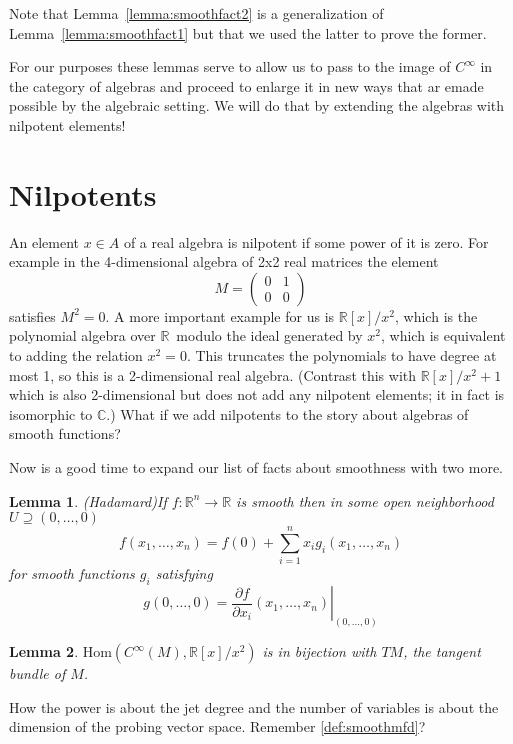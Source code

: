 \documentclass[12pt]{article}
\newcommand{\Hom}{\mathrm{Hom}}
\newcommand{\rr}{\ensuremath{\mathbb{R}}}
\newcommand{\cc}{\ensuremath{\mathbb{C}}}
\newcommand{\cinfty}{\ensuremath{C^{\infty}}}
\newtheorem{mylemma}{Lemma}
\begin{document}
Note that Lemma~\ref{lemma:smoothfact2} is a generalization of Lemma~\ref{lemma:smoothfact1} but that we used the latter to prove the former.

For our purposes these lemmas serve to allow us to pass to the image of $\cinfty$ in the category of algebras and proceed to enlarge it in new ways that ar emade possible by the algebraic setting. We will do that by extending the algebras with nilpotent elements!

\section{Nilpotents}\label{sec:nilpotents}

An element $x\in A$ of a real algebra is nilpotent if some power of it is zero. For example in the 4-dimensional algebra of 2x2 real matrices the element
\[
  M=\begin{pmatrix}
    0 & 1 \\
    0 & 0
  \end{pmatrix}
\]
satisfies $M^2=0$. A more important example for us is $\rr[x]/x^2$, which is the polynomial algebra over \rr\ modulo the ideal generated by $x^2$, which is equivalent to adding the relation $x^2=0$. This truncates the polynomials to have degree at most 1, so this is a 2-dimensional real algebra. (Contrast this with $\rr[x]/x^2+1$ which is also 2-dimensional but does not add any nilpotent elements; it in fact is isomorphic to \cc.) What if we add nilpotents to the story about algebras of smooth functions?

Now is a good time to expand our list of facts about smoothness with two more.

\begin{mylemma}(Hadamard)\label{lemma:hadamard} If $f:\rr^n\to\rr$ is smooth then in some open neighborhood $U\supseteq (0,\ldots,0)$
\[f(x_1,\ldots,x_n) = f(0) + \sum_{i=1}^n x_i g_i(x_1,\ldots,x_n)\]
for smooth functions $g_i$ satisfying
\[g(0,\ldots,0) = \left.\frac{\partial f}{\partial x_i}(x_1,\ldots,x_n)\right|_{(0,\ldots,0)}\]
\end{mylemma}

\begin{mylemma}\label{lemma:tangent}$\Hom(\cinfty(M),\rr[x]/x^2)$ is in bijection with $TM$, the tangent bundle of $M$.
\end{mylemma}


How the power is about the jet degree and the number of variables is about the dimension of the probing vector space. Remember \ref{def:smoothmfd}?
\end{document}

